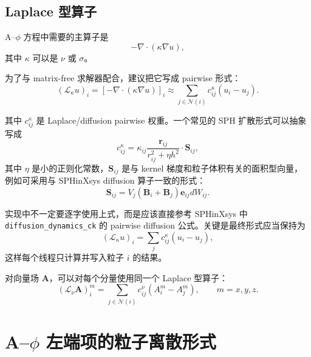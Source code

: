 \documentclass[UTF8,11pt]{ctexart}
\begin{document}
\subsection{Laplace 型算子}

A--$\phi$ 方程中需要的主算子是
\begin{equation}
    -\nabla\cdot(\kappa\nabla u),
\end{equation}
其中 $\kappa$ 可以是 $\nu$ 或 $\sigma$。

为了与 matrix-free 求解器配合，建议把它写成 pairwise 形式：
\begin{equation}
    \left(\mathcal{L}_{\kappa}u\right)_i
    =
    \left[-\nabla\cdot(\kappa\nabla u)\right]_i
    \approx
    \sum_{j\in\mathcal{N}(i)}
    c_{ij}^{\kappa}
    \left(
        u_i - u_j
    \right).
    \label{eq:laplace-pairwise}
\end{equation}

其中 $c_{ij}^{\kappa}$ 是 Laplace/diffusion pairwise 权重。一个常见的 SPH 扩散形式可以抽象写成
\begin{equation}
    c_{ij}^{\kappa}
    =
    \kappa_{ij}
    \frac{\bm r_{ij}}{r_{ij}^2+\eta h^2}
    \cdot
    \bm S_{ij},
    \label{eq:laplace-weight-general}
\end{equation}
其中 $\eta$ 是小的正则化常数，$\bm S_{ij}$ 是与 kernel 梯度和粒子体积有关的面积型向量，例如可采用与 SPHinXsys diffusion 算子一致的形式：
\begin{equation}
    \bm S_{ij}
    =
    V_j
    \left(\bm B_i+\bm B_j\right)
    \bm e_{ij}dW_{ij}.
    \label{eq:surface-area-like}
\end{equation}

实现中不一定要逐字使用上式，而是应该直接参考 SPHinXsys 中 \texttt{diffusion\_dynamics\_ck} 的 pairwise diffusion 公式。关键是最终形式应当保持为
\begin{equation}
    \left(\mathcal{L}_{\kappa}u\right)_i
    =
    \sum_j c_{ij}^{\kappa}(u_i-u_j),
\end{equation}
这样每个线程只计算并写入粒子 $i$ 的结果。

对向量场 $\bm A$，可以对每个分量使用同一个 Laplace 型算子：
\begin{equation}
    \left(\mathcal{L}_{\nu}\bm A\right)_i^m
    =
    \sum_{j\in\mathcal{N}(i)}
    c_{ij}^{\nu}
    \left(
        A_i^m-A_j^m
    \right),
    \qquad
    m=x,y,z.
\end{equation}

\section{A--$\phi$ 左端项的粒子离散形式}
\end{document}

